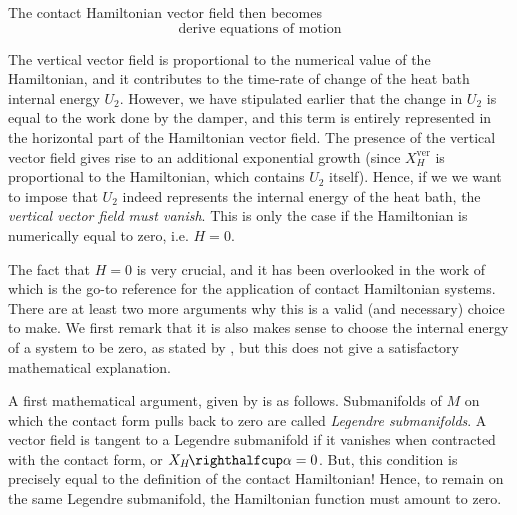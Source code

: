 The contact Hamiltonian vector field then becomes  
$$ \text{derive equations of motion} $$

The vertical vector field is proportional to the numerical value of the Hamiltonian, and it contributes to the time-rate of change of the heat bath internal energy $U_2$. However, we have stipulated earlier that the change in $U_2$ is equal to the work done by the damper, and this term is entirely represented in the horizontal part of the Hamiltonian vector field. The presence of the vertical vector field gives rise to an additional exponential growth (since $X_H^\text{ver}$ is proportional to the Hamiltonian, which contains $U_2$ itself). Hence, if we we want to impose that $U_2$ indeed represents the internal energy of the heat bath, the \emph{vertical vector field must vanish}. This is only the case if the Hamiltonian is numerically equal to zero, i.e. $H = 0$.

The fact that $H = 0$ is very crucial, and it has been overlooked in the work of \citet{Bravetti2017} which is the go-to reference for the application of contact Hamiltonian systems. There are at least two more arguments why this is a valid (and necessary) choice to make. We first remark that it is also makes sense to choose the internal energy of a system to be zero, as stated by \cite{Fermi1936}, but this does not give a satisfactory mathematical explanation.

A first mathematical argument, given by \cite{Mrugala1991} is as follows. Submanifolds of $M$ on which the contact form pulls back to zero are called \emph{Legendre submanifolds}.
A vector field is tangent to a Legendre submanifold if it vanishes when contracted with the contact form, or $ \intpr{X_H}{\alpha} = 0$. But, this condition is precisely equal to the definition of the contact Hamiltonian! Hence, to remain on the same Legendre submanifold, the Hamiltonian function must amount to zero. 

